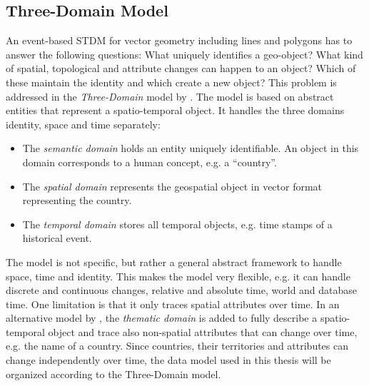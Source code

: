 
\subsection{Three-Domain Model} %
\label{sub:three_domain_model}

An event-based STDM for vector geometry including lines and polygons has to answer the following questions: What uniquely identifies a geo-object? What kind of spatial, topological and attribute changes can happen to an object? Which of these maintain the identity and which create a new object? This problem is addressed in the \emph{Three-Domain} model by \cite{yuan96threedomain, yuan96temporal}. The model is based on abstract entities that represent a spatio-temporal object. It handles the three domains identity, space and time separately:
\begin{itemize}
  \item The \emph{semantic domain} holds an entity uniquely identifiable. An object in this domain corresponds to a human concept, e.g. a ``country''.
  \item The \emph{spatial domain} represents the geospatial object in vector format representing the country.
  \item The \emph{temporal domain} stores all temporal objects, e.g. time stamps of a historical event.
\end{itemize}

The model is not specific, but rather a general abstract framework to handle space, time and identity. This makes the model very flexible, e.g. it can handle discrete and continuous changes, relative and absolute time, world and database time. One limitation is that it only traces spatial attributes over time. In an alternative model by \cite{claramunt95timeingis}, the \emph{thematic domain} is added to fully describe a spatio-temporal object and trace also non-spatial attributes that can change over time, e.g. the name of a country. Since countries, their territories and attributes can change independently over time, the data model used in this thesis will be organized according to the Three-Domain model.


